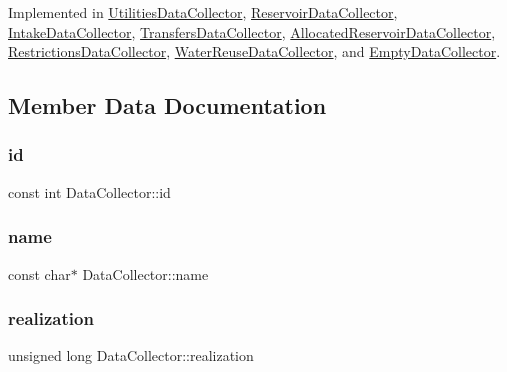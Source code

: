 Implemented in \mbox{\hyperlink{classUtilitiesDataCollector_ae502a096e8f4fdfdfd481ab2093f9771}{Utilities\+Data\+Collector}}, \mbox{\hyperlink{classReservoirDataCollector_ae2f8e808c5960608e510a64c7f00ad1b}{Reservoir\+Data\+Collector}}, \mbox{\hyperlink{classIntakeDataCollector_a2855eb8eed71649309bd4d9336f258c0}{Intake\+Data\+Collector}}, \mbox{\hyperlink{classTransfersDataCollector_ade6b896383f079d8973076e6b9a8053a}{Transfers\+Data\+Collector}}, \mbox{\hyperlink{classAllocatedReservoirDataCollector_a30d8c59205862822f6548472ba62e537}{Allocated\+Reservoir\+Data\+Collector}}, \mbox{\hyperlink{classRestrictionsDataCollector_afb3c49c2c9b152bb2372e2fcc198e1b8}{Restrictions\+Data\+Collector}}, \mbox{\hyperlink{classWaterReuseDataCollector_a8cead3771efabeb62dcf069008810f43}{Water\+Reuse\+Data\+Collector}}, and \mbox{\hyperlink{classEmptyDataCollector_aa71282121251d344d674223409445be9}{Empty\+Data\+Collector}}.



\subsection{Member Data Documentation}
\mbox{\label{classDataCollector_a5cb840b6fbcf6afe364eef9114984383}} 
\subsubsection{\texorpdfstring{id}{id}}
{\footnotesize\ttfamily const int Data\+Collector\+::id}

\mbox{\label{classDataCollector_a3a9a5033592f72ada429aa20056162b9}} 
\subsubsection{\texorpdfstring{name}{name}}
{\footnotesize\ttfamily const char$\ast$ Data\+Collector\+::name}

\mbox{\label{classDataCollector_a9ef2887466fe3123aa19ef956a219b96}} 
\subsubsection{\texorpdfstring{realization}{realization}}
{\footnotesize\ttfamily unsigned long Data\+Collector\+::realization}

